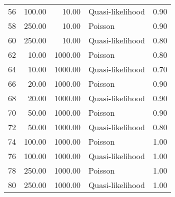\begin{table}[ht]
\begin{tabular}{rrrlr}
  56 & 100.00 & 10.00 & Quasi-likelihood & 0.90 \\ 
  58 & 250.00 & 10.00 & Poisson & 0.90 \\ 
  60 & 250.00 & 10.00 & Quasi-likelihood & 0.80 \\ 
  62 & 10.00 & 1000.00 & Poisson & 0.80 \\ 
  64 & 10.00 & 1000.00 & Quasi-likelihood & 0.70 \\ 
  66 & 20.00 & 1000.00 & Poisson & 0.90 \\ 
  68 & 20.00 & 1000.00 & Quasi-likelihood & 0.90 \\ 
  70 & 50.00 & 1000.00 & Poisson & 0.90 \\ 
  72 & 50.00 & 1000.00 & Quasi-likelihood & 0.80 \\ 
  74 & 100.00 & 1000.00 & Poisson & 1.00 \\ 
  76 & 100.00 & 1000.00 & Quasi-likelihood & 1.00 \\ 
  78 & 250.00 & 1000.00 & Poisson & 1.00 \\ 
  80 & 250.00 & 1000.00 & Quasi-likelihood & 1.00 \\ 
   \hline
\end{tabular}
\end{table}
